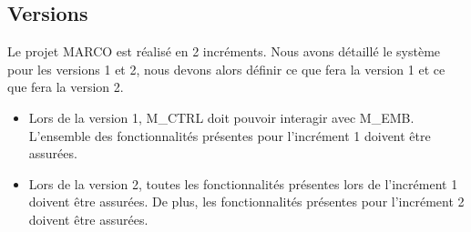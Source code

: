 \newpage
\subsection{Versions} %

Le projet \gls{MARCO} est réalisé en 2 incréments. Nous avons détaillé le système pour les versions 1 et 2, nous devons alors définir ce que fera la version 1 et ce
que fera la version 2.
\begin{itemize}
    \item Lors de la version 1, \gls{M_CTRL} doit pouvoir interagir avec \gls{M_EMB}. L'ensemble des fonctionnalités présentes pour l'incrément 1 doivent être assurées.
    \item Lors de la version 2, toutes les fonctionnalités présentes lors de l'incrément 1 doivent être assurées. De plus, les fonctionnalités présentes pour l'incrément 2 doivent être assurées.
\end{itemize}